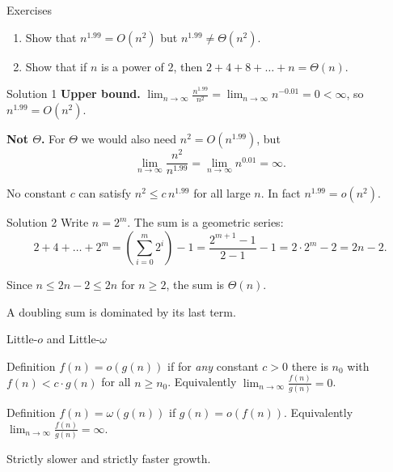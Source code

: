 \documentclass[10pt,aspectratio=169]{beamer}
\begin{document}
\begin{frame}{Exercises}
  \begin{enumerate}
    \item Show that $n^{1.99} = O(n^2)$ but $n^{1.99} \neq \Theta(n^2)$.
    \bigskip
    \item Show that if $n$ is a power of $2$, then
      $2 + 4 + 8 + \ldots + n = \Theta(n)$.
  \end{enumerate}
\end{frame}

\begin{frame}{Solution 1}
  \textbf{Upper bound.} $\displaystyle \lim_{n\to\infty}\frac{n^{1.99}}{n^2} = \lim_{n\to\infty} n^{-0.01} = 0 < \infty$,
  so $n^{1.99} = O(n^2)$.

  \bigskip
  \textbf{Not $\Theta$.} For $\Theta$ we would also need $n^2 = O(n^{1.99})$, but
  \[
    \lim_{n\to\infty}\frac{n^2}{n^{1.99}} = \lim_{n\to\infty} n^{0.01} = \infty.
  \]

  \bigskip
  No constant $c$ can satisfy $n^2 \le c\, n^{1.99}$ for all large $n$. In fact $n^{1.99} = o(n^2)$.
\end{frame}

\begin{frame}{Solution 2}
  Write $n = 2^m$. The sum is a geometric series:
  \[
    2 + 4 + \ldots + 2^m
    = \left(\sum_{i=0}^{m} 2^i\right) - 1
    = \frac{2^{m+1}-1}{2-1} - 1
    = 2 \cdot 2^m - 2 = 2n - 2.
  \]

  \bigskip
  Since $n \le 2n - 2 \le 2n$ for $n \ge 2$, the sum is $\Theta(n)$.

  \bigskip
  \begin{center}
    \small A doubling sum is dominated by its \alert{last} term.
  \end{center}
\end{frame}

\begin{frame}{Little-$o$ and Little-$\omega$}
  \begin{block}{Definition}
    $f(n) = o(g(n))$ if for \emph{any} constant $c > 0$ there is $n_0$ with
    $f(n) < c \cdot g(n)$ for all $n \ge n_0$.
    \quad Equivalently $\displaystyle \lim_{n\to\infty}\frac{f(n)}{g(n)} = 0$.
  \end{block}

  \begin{block}{Definition}
    $f(n) = \omega(g(n))$ if $g(n) = o(f(n))$.
    \quad Equivalently $\displaystyle \lim_{n\to\infty}\frac{f(n)}{g(n)} = \infty$.
  \end{block}

  \bigskip
  \begin{center}
    \alert{Strictly} slower and \alert{strictly} faster growth.
  \end{center}
\end{frame}
\end{document}
